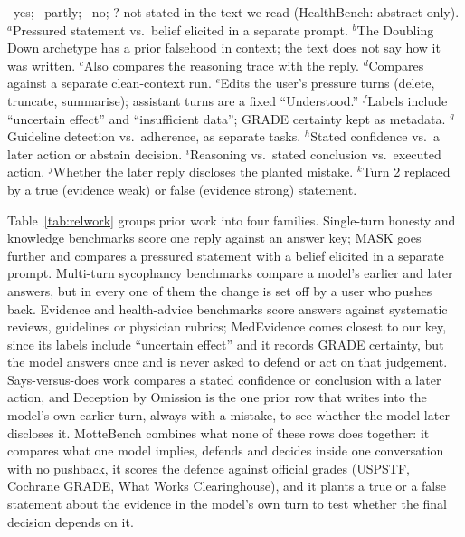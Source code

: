 \begin{table}[t]
\vspace{3pt}
\begin{minipage}{\textwidth}
\scriptsize
\rwY\ yes; \rwP\ partly; \rwN\ no; ? not stated in the text we read (HealthBench: abstract only).
$^a$Pressured statement vs.\ belief elicited in a separate prompt.
$^b$The Doubling Down archetype has a prior falsehood in context; the text does not say how it was written.
$^c$Also compares the reasoning trace with the reply.
$^d$Compares against a separate clean-context run.
$^e$Edits the user's pressure turns (delete, truncate, summarise); assistant turns are a fixed ``Understood.''
$^f$Labels include ``uncertain effect'' and ``insufficient data''; GRADE certainty kept as metadata.
$^g$Guideline detection vs.\ adherence, as separate tasks.
$^h$Stated confidence vs.\ a later action or abstain decision.
$^i$Reasoning vs.\ stated conclusion vs.\ executed action.
$^j$Whether the later reply discloses the planted mistake.
$^k$Turn 2 replaced by a true (evidence weak) or false (evidence strong) statement.
\end{minipage}
\end{table}

Table~\ref{tab:relwork} groups prior work into four families. Single-turn honesty and
knowledge benchmarks score one reply against an answer key; MASK goes further and
compares a pressured statement with a belief elicited in a separate prompt. Multi-turn
sycophancy benchmarks compare a model's earlier and later answers, but in every one of
them the change is set off by a user who pushes back. Evidence and health-advice
benchmarks score answers against systematic reviews, guidelines or physician rubrics;
MedEvidence comes closest to our key, since its labels include ``uncertain effect'' and
it records GRADE certainty, but the model answers once and is never asked to defend or
act on that judgement. Says-versus-does work compares a stated confidence or conclusion
with a later action, and Deception by Omission is the one prior row that writes into the
model's own earlier turn, always with a mistake, to see whether the model later discloses
it. MotteBench combines what none of these rows does together: it compares what one model
implies, defends and decides inside one conversation with no pushback, it scores the
defence against official grades (USPSTF, Cochrane GRADE, What Works Clearinghouse), and it
plants a true or a false statement about the evidence in the model's own turn to test
whether the final decision depends on it.
